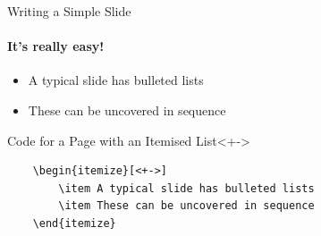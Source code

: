 \begin{frame}[fragile]{Writing a Simple Slide}
	\framesubtitle{It's really easy!}
	\begin{itemize}[<+->]
		\item A typical slide has bulleted lists
		\item These can be uncovered in sequence
	\end{itemize}
	\begin{block}{Code for a Page with an Itemised List}<+->
	\vspace{1em}
		\begin{verbatim}
    \begin{itemize}[<+->]
        \item A typical slide has bulleted lists
        \item These can be uncovered in sequence
    \end{itemize}
    \end{verbatim}
	\end{block}
\end{frame}
